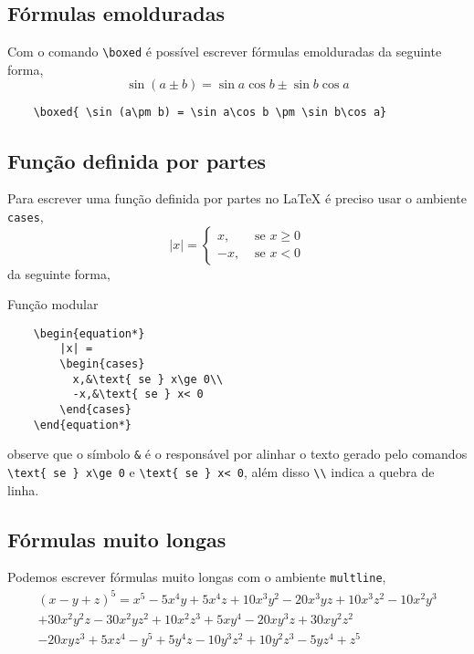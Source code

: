 \subsection{F\'ormulas emolduradas}
Com o comando \verb|\boxed| \'{e} poss\'{i}vel escrever f\'{o}rmulas emolduradas da seguinte forma,
\begin{equation*}
    \boxed{ \sin (a\pm b) = \sin a\cos b \pm \sin b\cos a}
\end{equation*}
\begin{verbatim}
    \boxed{ \sin (a\pm b) = \sin a\cos b \pm \sin b\cos a}
\end{verbatim}

\subsection{Fun\c c\~{a}o definida por partes}
Para escrever uma fun\c c\~{a}o definida por partes no \LaTeX$ $ \'{e} preciso usar o ambiente \verb|cases|,
\begin{equation*}
    |x| = \begin{cases}
      x,&\text{ se } x\ge 0\\
      -x,&\text{ se } x< 0
    \end{cases}
\end{equation*}
da seguinte forma,

\begin{programcode}{Função modular}
\begin{verbatim}
    \begin{equation*}
        |x| = 
        \begin{cases}
          x,&\text{ se } x\ge 0\\
          -x,&\text{ se } x< 0
        \end{cases}
    \end{equation*}
\end{verbatim}
\end{programcode}



\noindent observe que o s\'{i}mbolo \verb|&| \'{e} o respons\'{a}vel por alinhar o texto gerado pelo comandos \verb|\text{ se } x\ge 0| e \verb|\text{ se } x< 0|, al\'{e}m disso \verb|\\| indica a quebra de linha. 
\newpage
\subsection{F\'{o}rmulas muito longas}
Podemos escrever f\'{o}rmulas muito longas com o ambiente \verb|multline|,
\begin{multline*}
    (x-y+z)^{5} = x^{5} - 5x^{4}y + 5x^{4}z + 10x^{3}y^{2} - 20x^{3}yz + 10x^{3}z^{2} - 10x^{2}y^{3}\\
    + 30x^{2}y^{2}z - 30x^{2}yz^{2} + 10x^{2}z^{3} + 5xy^{4} - 20xy^{3}z + 30xy^{2}z^{2}\\
    - 20xyz^{3} + 5xz^{4} - y^{5} + 5y^{4}z - 10y^{3}z^{2} + 10y^{2}z^{3} - 5yz^{4} + z^{5}
\end{multline*}


